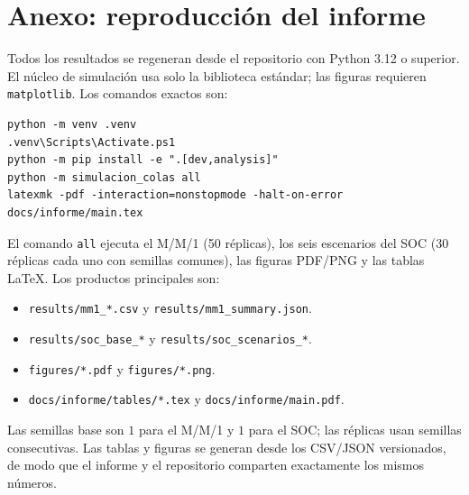 \section{Anexo: reproducción del informe}

Todos los resultados se regeneran desde el repositorio con Python 3.12 o
superior. El núcleo de simulación usa solo la biblioteca estándar; las figuras
requieren \texttt{matplotlib}. Los comandos exactos son:
\begin{verbatim}
python -m venv .venv
.venv\Scripts\Activate.ps1
python -m pip install -e ".[dev,analysis]"
python -m simulacion_colas all
latexmk -pdf -interaction=nonstopmode -halt-on-error docs/informe/main.tex
\end{verbatim}

El comando \texttt{all} ejecuta el M/M/1 (50 réplicas), los seis escenarios del
SOC (30 réplicas cada uno con semillas comunes), las figuras PDF/PNG y las
tablas LaTeX. Los productos principales son:
\begin{itemize}[leftmargin=1.2em,itemsep=0.1em]
  \item \texttt{results/mm1\_*.csv} y \texttt{results/mm1\_summary.json}.
  \item \texttt{results/soc\_base\_*} y \texttt{results/soc\_scenarios\_*}.
  \item \texttt{figures/*.pdf} y \texttt{figures/*.png}.
  \item \texttt{docs/informe/tables/*.tex} y \texttt{docs/informe/main.pdf}.
\end{itemize}

Las semillas base son $1$ para el M/M/1 y $1$ para el SOC; las réplicas usan
semillas consecutivas. Las tablas y figuras se generan desde los CSV/JSON
versionados, de modo que el informe y el repositorio comparten exactamente los
mismos números.
